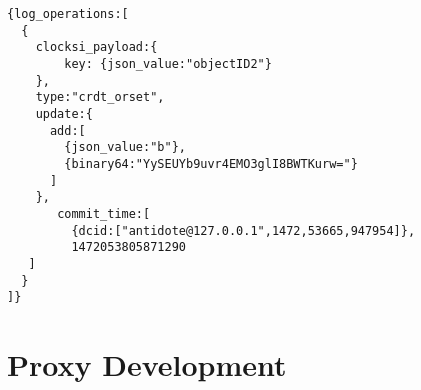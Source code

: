 \begin{lstlisting}[caption={Antidote log response example},label={lst:log_example}]
{log_operations:[
  {
    clocksi_payload:{
        key: {json_value:"objectID2"}
    },
    type:"crdt_orset",
    update:{
      add:[
        {json_value:"b"},
        {binary64:"YySEUYb9uvr4EMO3glI8BWTKurw="}
      ]
    },
       commit_time:[
         {dcid:["antidote@127.0.0.1",1472,53665,947954]},
         1472053805871290
   ]
  }
]}
\end{lstlisting}

\section{Proxy Development}
\label{sec:proxy_development}



